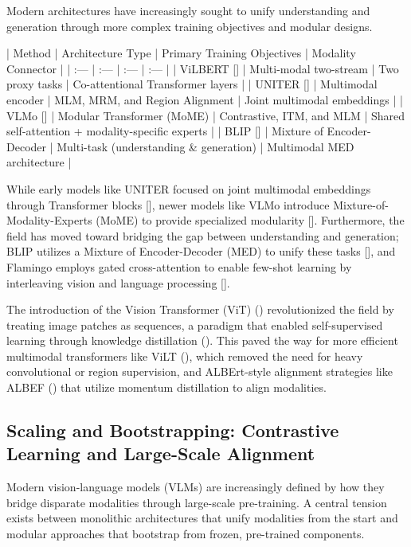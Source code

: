 \documentclass[11pt]{article}
\begin{document}
Modern architectures have increasingly sought to unify understanding and generation through more complex training objectives and modular designs.

| Method | Architecture Type | Primary Training Objectives | Modality Connector |
| :--- | :--- | :--- | :--- |
| ViLBERT [\citep{1908.02265}] | Multi-modal two-stream | Two proxy tasks | Co-attentional Transformer layers |
| UNITER [\citep{1909.11740}] | Multimodal encoder | MLM, MRM, and Region Alignment | Joint multimodal embeddings |
| VLMo [\citep{2111.02358}] | Modular Transformer (MoME) | Contrastive, ITM, and MLM | Shared self-attention + modality-specific experts |
| BLIP [\citep{2201.12086}] | Mixture of Encoder-Decoder | Multi-task (understanding \& generation) | Multimodal MED architecture |

While early models like UNITER focused on joint multimodal embeddings through Transformer blocks [\citep{1909.11740}], newer models like VLMo introduce Mixture-of-Modality-Experts (MoME) to provide specialized modularity [\citep{2111.02358}]. Furthermore, the field has moved toward bridging the gap between understanding and generation; BLIP utilizes a Mixture of Encoder-Decoder (MED) to unify these tasks [\citep{2201.12086}], and Flamingo employs gated cross-attention to enable few-shot learning by interleaving vision and language processing [\citep{2204.14198}].

The introduction of the Vision Transformer (ViT) (\citep{2010.11929}) revolutionized the field by treating image patches as sequences, a paradigm that enabled self-supervised learning through knowledge distillation (\citep{2104.14294}). This paved the way for more efficient multimodal transformers like ViLT (\citep{2102.03334}), which removed the need for heavy convolutional or region supervision, and ALBErt-style alignment strategies like ALBEF (\citep{2107.07651}) that utilize momentum distillation to align modalities.
\subsection{Scaling and Bootstrapping: Contrastive Learning and Large-Scale Alignment}

Modern vision-language models (VLMs) are increasingly defined by how they bridge disparate modalities through large-scale pre-training. A central tension exists between monolithic architectures that unify modalities from the start and modular approaches that bootstrap from frozen, pre-trained components.
\end{document}
